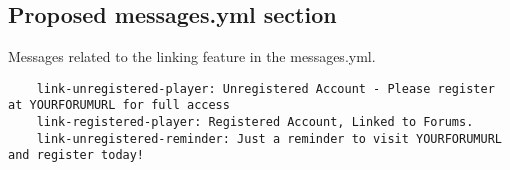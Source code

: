 \documentclass[letterpaper,12pt]{article}
\begin{document}
  \subsection{Proposed messages.yml section}
  Messages related to the linking feature in the messages.yml.

  \begin{verbatim}
    link-unregistered-player: Unregistered Account - Please register at YOURFORUMURL for full access
    link-registered-player: Registered Account, Linked to Forums.
    link-unregistered-reminder: Just a reminder to visit YOURFORUMURL and register today!
  \end{verbatim}
\end{document}
